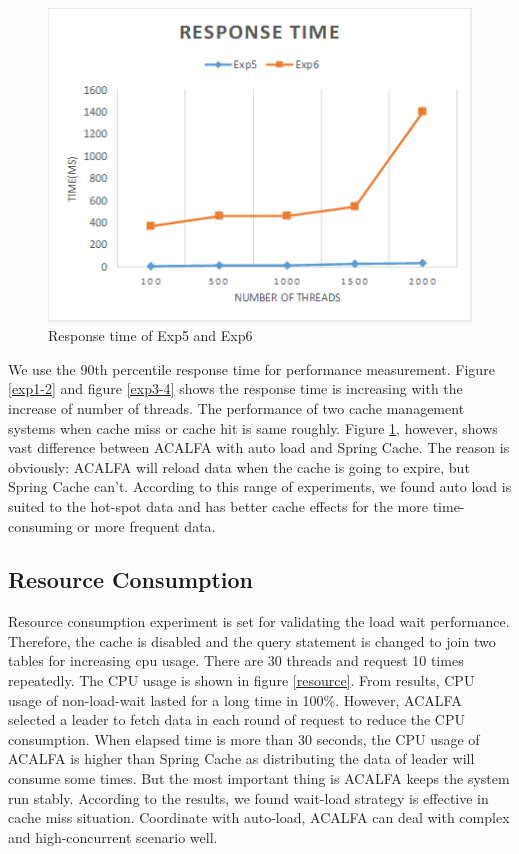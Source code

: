\documentclass{singlecol-new}
\theoremstyle{TH}{
\newtheorem{lemma}{Lemma}
\newtheorem{theorem}[lemma]{Theorem}
\newtheorem{corrolary}[lemma]{Corrolary}
\newtheorem{conjecture}[lemma]{Conjecture}
\newtheorem{proposition}[lemma]{Proposition}
\newtheorem{claim}[lemma]{Claim}
\newtheorem{stheorem}[lemma]{Wrong Theorem}
}
\theoremstyle{THrm}{
\newtheorem{definition}{Definition}[section]
\newtheorem{question}{Question}[section]
\newtheorem{remark}{Remark}
\newtheorem{scheme}{Scheme}
}
\theoremstyle{THhit}{
\newtheorem{case}{Case}[section]
}
\begin{document}
\begin{figure} [htb]
    \centering
    \includegraphics[width=1\linewidth]{img/exp5-6.png}
    \caption{Response time of Exp5 and Exp6}
    \label{exp5-6}
\end{figure}

We use the 90th percentile response time for performance measurement. Figure \ref{exp1-2} and figure \ref{exp3-4} shows the response time is increasing with the increase of number of threads. The performance of two cache management systems when cache miss or cache hit is same roughly. Figure \ref{exp5-6}, however, shows vast difference between ACALFA with auto load and Spring Cache. The reason is obviously: ACALFA will reload data when the cache is going to expire, but Spring Cache can't. According to this range of experiments, we found auto load is suited to the hot-spot data and has better cache effects for the more time-consuming or more frequent data.

\subsection{Resource Consumption}

Resource consumption experiment is set for validating the load wait performance. Therefore, the cache is disabled and the query statement is changed to join two tables for increasing cpu usage. There are 30 threads and request 10 times repeatedly. The CPU usage is shown in figure \ref{resource}. From results, CPU usage of non-load-wait lasted for a long time in 100\%. However, ACALFA selected a leader to fetch data in each round of request to reduce the CPU consumption. When elapsed time is more than 30 seconds, the CPU usage of ACALFA is higher than Spring Cache as distributing the data of leader will consume some times. But the most important thing is ACALFA keeps the system run stably. According to the results, we found wait-load strategy is effective in cache miss situation. Coordinate with auto-load, ACALFA can deal with complex and high-concurrent scenario well.
\end{document}

